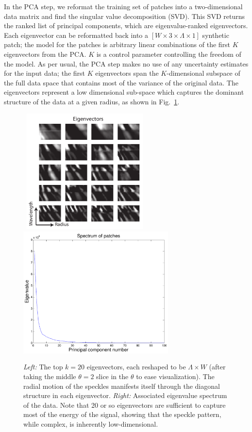 \documentclass[12pt,pdftex,preprint]{aastex}
\newcommand{\fig}[1]{Fig.\ \ref{fig:#1}}
\begin{document}
In the PCA step, we reformat the training set of patches into a
two-dimensional data matrix and find the singular value decomposition
(SVD).  This SVD returns the ranked list of principal components,
which are eigenvalue-ranked eigenvectors.  Each eigenvector can be
reformatted back into a $[W\times 3\times\Lambda\times 1]$ synthetic
patch; the model for the patches is arbitrary linear combinations of
the first $K$ eigenvectors from the PCA.  $K$ is a control parameter
controlling the freedom of the model.  As per usual, the PCA step
makes no use of any uncertainty estimates for the input data; the
first $K$ eigenvectors span the $K$-dimensional subspace of the full
data space that contains most of the variance of the original data.
The eigenvectors represent a low dimensional sub-space which captures
the dominant structure of the data at a given radius, as shown in \fig{spectrum}.

\begin{figure}[h!]
\begin{center}
\mbox{
\includegraphics[width=2.5in]{figs/eigenvectors.pdf}
\includegraphics[width=3.1in]{figs/spectrum.pdf}
}
\end{center}
\vspace{-7mm}
\caption{{\em Left:} The top $k=20$ eigenvectors, each reshaped to be
 $\Lambda \times W$ (after taking the middle $\theta=2$ slice in the
 $\theta$ to ease visualization). The radial motion of the speckles
 manifests itself through the diagonal structure in each eigenvector. {\em Right:} Associated
 eigenvalue spectrum of the data. Note that 20 or so eigenvectors are
 sufficient to capture most of the energy of the signal, showing that
the speckle pattern, while complex, is inherently low-dimensional.}
\label{fig:spectrum}
\end{figure}
\end{document}
